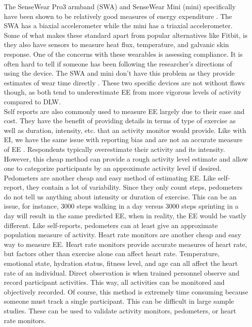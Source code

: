 \documentclass[11pt]{article}\usepackage[]{graphicx}\usepackage[]{color}
\begin{document}
The SenseWear Pro3 armband (SWA) and SenseWear Mini (mini) specifically have been shown to be relatively good measures of energy expenditure \cite{johannsen10}. The SWA has a biaxial accelerometer while the mini has a triaxial accelerometer. Some of what makes these standard apart from popular alternatives like Fitbit, is they also have sensors to measure heat flux, temperature, and galvanic skin response. One of the concerns with these wearables is assessing compliance. It is often hard to tell if someone has been following the researcher's directions of using the device. The SWA and mini don't have this problem as they provide estimates of wear time directly \cite{johannsen10}. These two specific devices are not without flaws though, as both tend to underestimate EE from more vigorous levels of activity compared to DLW. \\

Self reports are also commonly used to measure EE largely due to their ease and cost. They have the benefit of providing details in terms of type of exercise as well as duration, intensity, etc. that an activity monitor would provide. Like with EI, we have the same issue with reporting bias and are not an accurate measure of EE \cite{neilson08}. Respondents typically overestimate their activity and its intensity. However, this cheap method can provide a rough activity level estimate and allow one to categorize participants by an approximate activity level if desired. \\

Pedometers are another cheap and easy method of estimating EE. Like self-report, they contain a lot of variability. Since they only count steps, pedometers do not tell us anything about intensity or duration of exercise. This can be an issue, for instance, 3000 steps walking in a day versus 3000 steps sprinting in a day will result in the same predicted EE, when in reality, the EE would be vastly different. Like self-reports, pedometers can at least give an approximate population measure of activity. Heart rate monitors are another cheap and easy way to measure EE. Heart rate monitors provide accurate measures of heart rate, but factors other than exercise alone can affect heart rate. Temperature, emotional state, hydration status, fitness level, and age can all affect the heart rate of an individual. Direct observation is when trained personnel observe and record participant activities. This way, all activities can be monitored and objectively recorded. Of course, this method is extremely time consuming because someone must track a single participant. This can be difficult in large sample studies. These can be used to validate activity monitors, pedometers, or heart rate monitors. 
\end{document}
